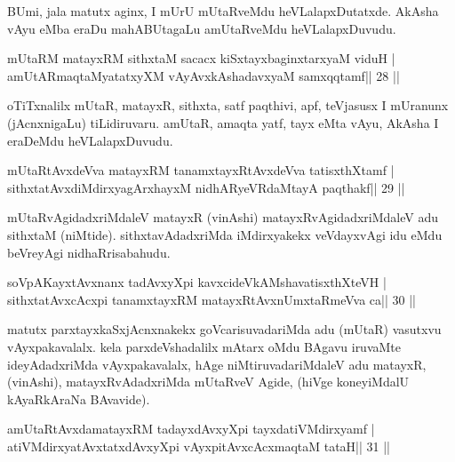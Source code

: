 \begin{artha}
BUmi, jala matutx aginx, I mUrU mUtaRveMdu heVLalapxDutatxde. AkAsha vAyu eMba eraDu mahABUtagaLu amUtaRveMdu heVLalapxDuvudu.
\end{artha}

\begin{shl}
mUtaRM matayxRM sithxtaM sacacx kiSxtayxbaginxtarxyaM viduH |
amUtARmaqtaMyatatxyXM vAyAvxkAshadavxyaM samxqqtamf\hfill || 28 ||
\end{shl}

\begin{artha}
oTiTxnalilx mUtaR, matayxR, sithxta, satf paqthivi, apf, teVjasusx I mUranunx (jAcnxnigaLu) tiLidiruvaru. amUtaR, amaqta yatf, tayx eMta vAyu, AkAsha I eraDeMdu heVLalapxDuvudu.
\end{artha}



\begin{shl}
mUtaRtAvxdeVva matayxRM tanamxtayxRtAvxdeVva tatisxthXtamf |
sithxtatAvxdiMdirxyagArxhayxM nidhARyeVRdaMtayA paqthakf\hfill || 29 ||
\end{shl}

\begin{artha}
mUtaRvAgidadxriMdaleV matayxR (vinAshi) matayxRvAgidadxriMdaleV adu sithxtaM (niMtide). sithxtavAdadxriMda iMdirxyakekx veVdayxvAgi idu eMdu beVreyAgi nidhaRrisabahudu.
\end{artha}



\begin{shl}
soVpAKayxtAvxnanx tadAvxyXpi kavxcideVkAMshavatisxthXteVH |
sithxtatAvxcAcxpi tanamxtayxRM matayxRtAvxnUmxtaRmeVva ca\hfill || 30 ||
\end{shl}

\begin{artha}
matutx parxtayxkaSxjAcnxnakekx goVcarisuvadariMda adu (mUtaR) vasutxvu vAyxpakavalalx. kela parxdeVshadalilx mAtarx oMdu BAgavu iruvaMte  ideyAdadxriMda vAyxpakavalalx, hAge niMtiruvadariMdaleV adu matayxR, (vinAshi), matayxRvAdadxriMda mUtaRveV Agide, (hiVge koneyiMdalU kAyaRkAraNa BAvavide).
\end{artha}



\begin{shl}
amUtaRtAvxdamatayxRM tadayxdAvxyXpi tayxdatiVMdirxyamf |
atiVMdirxyatAvxtatxdAvxyXpi vAyxpitAvxcAcxmaqtaM tataH\hfill || 31 ||
\end{shl}

